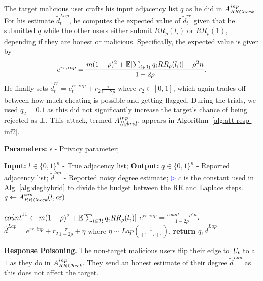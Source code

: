 The target malicious user crafts his input adjacency list $q$ as he did in $A_{\textit{RRCheck}}^{inp}$. For his estimate $\tilde{d}_t^{Lap}$, he 
computes the expected value of $\tilde{d}_t^{rr}$ given that he submitted $q$ while the other users either submit $RR_\rho(l_i)$ or $RR_\rho(1)$, depending if they are honest or malicious. Specifically, the expected value is given by
\[
    e^{rr,inp} = \frac{m(1-\rho)^2 + \operatorname{\mathbb{E}}[\sum_{i \in \mathcal{H}} q_i RR_\rho(l_i)] - \rho^2 n}{1-2\rho}.
\]
He finally sets $\tilde{d}_t^{rr} = e_t^{rr,inp} + r_2 \frac{\tau}{1-2\rho}$ where $r_2 \in [0,1]$, which again trades off between how much cheating is possible and getting flagged. During the trials, we used $q_2 = 0.1$ as this did not significantly increase the target's chance of being rejected as $\perp$. This attack, termed $A_{\textit{Hybrid}}^{inp}$, appears in Algorithm~\ref{alg:att-resp-inf2}.

\begin{algorithm}[bt]
  \caption{$A_{\DegHybrid}^{inp}: \{0,1\}^n\mapsto\{0,1\}^n$ }\label{alg:att-resp-inf2}
  \begin{algorithmic}[1]
  \Statex \textbf{Parameters:} $\epsilon$ - Privacy parameter;

  \Statex\textbf{Input:} $l \in \{0,1\}^n$ - True adjacency list;
  \Statex \textbf{Output:} $q \in \{0,1\}^n$ - Reported adjacency list;
  \Statex \hspace{1.1cm} $\tilde{d}^{lap}$ - Reported noisy degree estimate;
  \vspace{0.2cm}
\Statex \hfill\textcolor{blue}{$\rhd$} $c$ is the constant used in Alg. \ref{alg:deghybrid} to divide the budget between the RR and Laplace steps.
\State $q \gets A_{\textit{RRCheck}}^{inp}(l, c\varepsilon)$

\State $\tilde{count}^{11} \gets m(1-\rho)^2 + \operatorname{\mathbb{E}}[\sum_{i \in \mathcal{H}} q_i RR_\rho(l_i)]$
\State $ e^{rr,inp} = \frac{\tilde{count}^{11} - \rho^2 n}{1-2\rho}$.
\State $ \hat{d}^{Lap} = e^{rr,inp} + r_2 \frac{\tau}{1-2\rho} + \eta$ where $\eta \sim Lap(\frac{1}{(1-c)\epsilon})$.
\Statex \textbf{return} $q,\tilde{d}^{Lap}$
  \end{algorithmic}
\end{algorithm}


\noindent\textbf{Response Poisoning.}
The non-target malicious users flip their edge to $\textit{U}_t$ to a $1$ as they do in $A_{\textit{RRCheck}{}}^{inp}$. They send an honest estimate of their degree $\tilde{d}^{Lap}$ as this does not affect the target.

